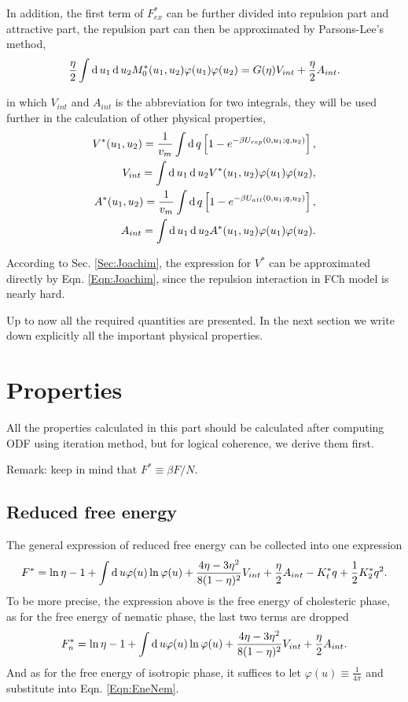 In addition, the first term of $F_{ex}^*$ can be further divided into repulsion part and attractive part, the repulsion part can then be approximated by Parsons-Lee's method,
\begin{equation}
	\frac{\eta}{2}\int\operatorname{d}u_1\operatorname{d}u_2M_0^*(u_1,u_2)\varphi(u_1)\varphi(u_2)=G(\eta)V_{int}+\frac{\eta}{2}A_{int}.
\end{equation}

in which $V_{int}$ and $A_{int}$ is the abbreviation for two integrals, they will be used further in the calculation of other physical properties,
\begin{equation}\label{Eqn:VAstar}
	\begin{split}
		V^*(u_1,u_2)=\frac{1}{v_m}\int\operatorname{d}q\left[1-e^{-\beta U_{rep}(0,u_1;q,u_2)}\right],\\
		V_{int} = \int\operatorname{d}u_1\operatorname{d}u_2V^*(u_1,u_2)\varphi(u_1)\varphi(u_2), \\
		A^*(u_1,u_2)=\frac{1}{v_m}\int\operatorname{d}q\left[1-e^{-\beta U_{att}(0,u_1;q,u_2)}\right],\\
		A_{int}=\int\operatorname{d}u_1\operatorname{d}u_2A^*(u_1,u_2)\varphi(u_1)\varphi(u_2).
	\end{split}
\end{equation}

According to Sec. \ref{Sec:Joachim}, the expression for $V^*$ can be approximated directly by Eqn. \ref{Eqn:Joachim}, since the repulsion interaction in FCh model is nearly hard.

Up to now all the required quantities are presented. In the next section we write down explicitly all the important physical properties.

\section{Properties}
All the properties calculated in this part should be calculated after computing ODF using iteration method, but for logical coherence, we derive them first.

Remark: keep in mind that $F^*\equiv\beta F/N$.
\subsection{Reduced free energy}
The general expression of reduced free energy can be collected into one expression
\begin{equation}\label{Eqn:FreeEne}
	F^*=\ln\eta -1+\int\operatorname{d}u\varphi(u)\ln \varphi(u)+\frac{4\eta-3\eta^2}{8(1-\eta)^2}V_{int}+\frac{\eta}{2}A_{int}-K_t^*q+\frac{1}{2}K_2^*q^2.
\end{equation}
To be more precise, the expression above is the free energy of cholesteric phase, as for the free energy of nematic phase, the last two terms are dropped
\begin{equation}\label{Eqn:EneNem}
	F_{n}^*=\ln\eta -1+\int\operatorname{d}u\varphi(u)\ln \varphi(u)+\frac{4\eta-3\eta^2}{8(1-\eta)^2}V_{int}+\frac{\eta}{2}A_{int}.
\end{equation}
And as for the free energy of isotropic phase, it suffices to let $\varphi(u)\equiv \frac{1}{4\pi}$ and substitute into Eqn. \ref{Eqn:EneNem}.

